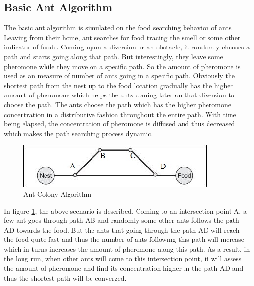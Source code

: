 \subsection{Basic Ant Algorithm}

The basic ant algorithm is simulated on the food searching behavior of ants. Leaving from their home, ant searches for food tracing the smell or some other indicator of foods. Coming upon a diversion or an obstacle, it randomly chooses a path and starts going along that path. But interestingly, they leave some pheromone while they move on a specific path. So the amount of pheromone is used as an measure of number of ants going in a specific path. Obviously the shortest path from the nest up to the food location gradually has the higher amount of pheromone which helps the ants coming later on that diversion to choose the path. The ants choose the path which has the higher pheromone concentration in a distributive fashion throughout the entire path. With time being elapsed, the concentration of pheromone is diffused and thus decreased which makes the path searching process dynamic.

\begin{figure}
    \centering
    \includegraphics[scale=0.9]{ant2}
    \caption{Ant Colony Algorithm}
    \label{ant}
\end{figure}

In figure \ref{ant}, the above scenario is described. Coming to an intersection point A, a few ant goes through path AB and randomly some other ants follows the path AD towards the food. But the ants that going through the path AD will reach the food quite fast and thus the number of ants following this path will increase which in turns increases the amount of pheromone along this path. As a result, in the long run, when other ants will come to this intersection point, it will assess the amount of pheromone and find its concentration higher in the path AD and thus the shortest path will be converged. 

